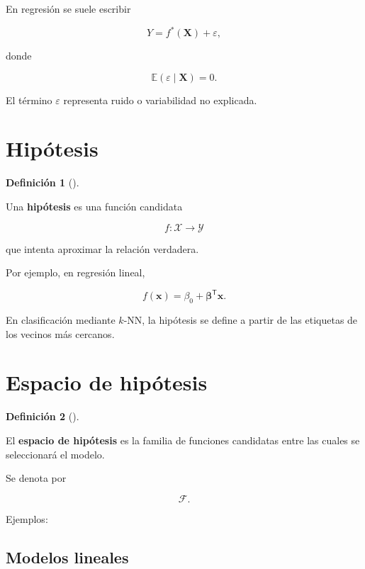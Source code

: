 \documentclass[
  spanish,
  11pt,
  letterpaper,
  DIV=11,
  numbers=noendperiod]{scrreprt}
\theoremstyle{definition}
\newtheorem{definition}{Definición}[chapter]
\theoremstyle{plain}
\theoremstyle{definition}
\theoremstyle{remark}
\begin{document}
En regresión se suele escribir

\[
Y
=
f^{*}(\mathbf{X})
+
\varepsilon,
\]

donde

\[
\mathbb{E}(\varepsilon\mid\mathbf{X})=0.
\]

El término \(\varepsilon\) representa ruido o variabilidad no explicada.

\section{Hipótesis}\label{hipuxf3tesis}

\begin{definition}[]\protect\hypertarget{def-hipotesis}{}\label{def-hipotesis}

Una \textbf{hipótesis} es una función candidata

\[
f:\mathcal{X}\to\mathcal{Y}
\]

que intenta aproximar la relación verdadera.

\end{definition}

Por ejemplo, en regresión lineal,

\[
f(\mathbf{x})
=
\beta_0
+
\boldsymbol{\beta}^{\mathsf T}\mathbf{x}.
\]

En clasificación mediante \(k\)-NN, la hipótesis se define a partir de
las etiquetas de los vecinos más cercanos.

\section{Espacio de hipótesis}\label{espacio-de-hipuxf3tesis}

\begin{definition}[]\protect\hypertarget{def-espacio-hipotesis}{}\label{def-espacio-hipotesis}

El \textbf{espacio de hipótesis} es la familia de funciones candidatas
entre las cuales se seleccionará el modelo.

\end{definition}

Se denota por

\[
\mathcal{F}.
\]

Ejemplos:

\subsection{Modelos lineales}\label{modelos-lineales}
\end{document}
